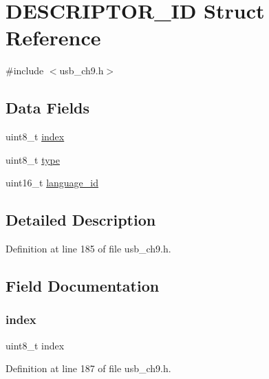 \hypertarget{struct_d_e_s_c_r_i_p_t_o_r___i_d}{}\section{D\+E\+S\+C\+R\+I\+P\+T\+O\+R\+\_\+\+ID Struct Reference}
\label{struct_d_e_s_c_r_i_p_t_o_r___i_d}


{\ttfamily \#include $<$usb\+\_\+ch9.\+h$>$}

\subsection*{Data Fields}
\begin{DoxyCompactItemize}
\item 
uint8\+\_\+t \mbox{\hyperlink{struct_d_e_s_c_r_i_p_t_o_r___i_d_aae5a12e607d0f782506d9e6ec6179c64}{index}}
\item 
uint8\+\_\+t \mbox{\hyperlink{struct_d_e_s_c_r_i_p_t_o_r___i_d_a1d127017fb298b889f4ba24752d08b8e}{type}}
\item 
uint16\+\_\+t \mbox{\hyperlink{struct_d_e_s_c_r_i_p_t_o_r___i_d_a2c757481a5f7d121acdf6e619bd44362}{language\+\_\+id}}
\end{DoxyCompactItemize}


\subsection{Detailed Description}


Definition at line 185 of file usb\+\_\+ch9.\+h.



\subsection{Field Documentation}
\mbox{\label{struct_d_e_s_c_r_i_p_t_o_r___i_d_aae5a12e607d0f782506d9e6ec6179c64}} 
\subsubsection{\texorpdfstring{index}{index}}
{\footnotesize\ttfamily uint8\+\_\+t index}



Definition at line 187 of file usb\+\_\+ch9.\+h.

\mbox{\label{struct_d_e_s_c_r_i_p_t_o_r___i_d_a2c757481a5f7d121acdf6e619bd44362}} 
